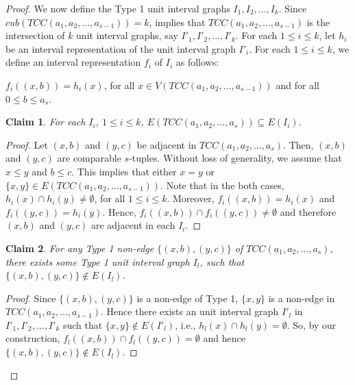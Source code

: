 \documentclass[twoside, 11pt]{article}
\newtheorem{claim}{Claim}
\newcommand{\T}{TCC(a_1,a_2,\dots,a_{s-1})}
\newcommand{\TT}{TCC(a_1,a_2,\dots,a_s)}
\begin{document}
\begin{proof}
    \vspace{0.2cm}

    We now define the Type 1 unit interval graphs \( I_1, I_2, \dots, I_k \). Since $cub(\T)=k$,  implies that $\T$ is the intersection of $k$ unit interval graphs, say $I'_1,I'_2,\dots, I'_k$. For each $1\leq i \leq k$, let $h_i$ be an interval representation of the unit interval graph $I'_i$. For each $1\leq i \leq k$, we define an interval representation $f_i$ of $I_i$ as follows: %

    
   \begin{center}
       $f_i((x,b)) = h_i(x)$, for all $x \in V(\T)$ and for all $0 \leq b \leq a_s$.
   \end{center} 

    \begin{claim}\label{type 1 interval graphs are supergraphs}
        For each $I_i$, $1 \leq i \leq k$, $E(\TT) \subseteq E(I_i)$.
    \end{claim}
    \begin{proof}
        
        Let $(x,b)$ and $(y,c)$ be adjacent in $\TT$. Then, $(x,b)$ and $(y,c)$ are comparable $s$-tuples. Without loss of generality, we assume that $x \leq y$ and $b \leq c$. This implies that either $x=y$ or $\{x,y\} \in E(\T)$. Note that in the both cases, $h_i(x) \cap h_i(y) \neq \emptyset$, for all $1 \leq i \leq k$. Moreover, $f_i((x,b))=h_i(x)$ and $f_i((y,c))=h_i(y)$. Hence, $f_i((x,b)) \cap f_i((y,c)) \neq \emptyset$ and therefore $(x,b)$ and $(y,c)$ are adjacent in each $I_i$.
    \end{proof}

   \begin{claim}\label{type 1 interval graphs and non-edge}
       For any Type 1 non-edge $\{(x,b),(y,c)\}$ of $\TT$,
    there exists some Type 1 unit interval graph $I_l$, such that $\{(x,b),(y,c)\} \notin E(I_l)$.
   \end{claim} 
    \begin{proof}
        Since $\{(x,b),(y,c)\}$ is a non-edge of Type 1, $\{x,y\}$ is a non-edge in $\T$. Hence there exists an unit interval graph $I'_l$ in $I'_1,I'_2,\dots,I'_k$ such that $\{x,y\} \notin E(I'_l)$, i.e., $h_l(x)\cap h_l(y)=\emptyset$. So, by our construction, $f_l((x,b))\cap f_l((y,c))=\emptyset$ and hence $\{(x,b),(y,c)\} \notin E(I_l)$.
    \end{proof}


\end{proof}
\end{document}
